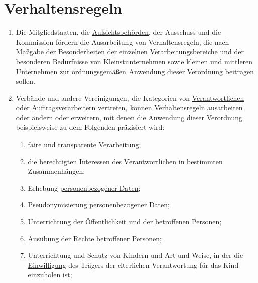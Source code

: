 \chapter{Verhaltensregeln}
\label{ch:40}

\begin{enumerate}

  \item Die Mitgliedstaaten, die \hyperref[itm:04-21]{Aufsichtsbehörden}, der Ausschuss und die Kommission fördern die
   Ausarbeitung von Verhaltensregeln, die nach Maßgabe der Besonderheiten der einzelnen Verarbeitungsbereiche und der
   besonderen Bedürfnisse von Kleinstunternehmen sowie kleinen und mittleren \hyperref[itm:04-18]{Unternehmen} zur
   ordnungsgemäßen Anwendung dieser Verordnung beitragen sollen.%
  \label{itm:40-1}

  \item Verbände und andere Vereinigungen, die Kategorien von \hyperref[itm:04-7]{Verantwortlichen} oder \hyperref
   [itm:04-8]{Auftragsverarbeitern} vertreten, können Verhaltensregeln ausarbeiten oder ändern oder erweitern, mit
   denen die Anwendung dieser Verordnung beispielsweise zu dem Folgenden präzisiert wird:%
  \label{itm:40-2}

  \begin{enumerate}
  
    \item faire und transparente \hyperref[itm:04-2]{Verarbeitung};%
    \label{itm:40-2a}

    \item die berechtigten Interessen des \hyperref[itm:04-7]{Verantwortlichen} in bestimmten Zusammenhängen;%
    \label{itm:40-2b}

    \item Erhebung \hyperref[itm:04-1]{personenbezogener Daten};%
    \label{itm:40-2c}

    \item \hyperref[itm:04-5]{Pseudonymisierung} \hyperref[itm:04-1]{personenbezogener Daten};%
    \label{itm:40-2d}

    \item Unterrichtung der Öffentlichkeit und der \hyperref[itm:04-1]{betroffenen Personen};%
    \label{itm:40-2e}

    \item Ausübung der Rechte \hyperref[itm:04-1]{betroffener Personen};%
    \label{itm:40-2f}

    \item Unterrichtung und Schutz von Kindern und Art und Weise, in der die \hyperref[itm:04-11]{Einwilligung} des
     Trägers der elterlichen Verantwortung für das Kind einzuholen ist;%
    \label{itm:40-2g}


\end{enumerate}
\end{enumerate}
